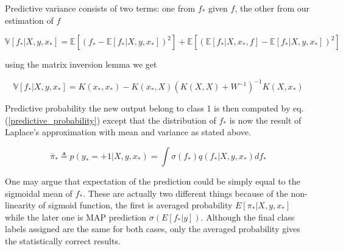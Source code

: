 \documentclass[11pt]{report}
\numberwithin{equation}{chapter}
\begin{document}
\begin{spacing}{2}
Predictive variance consists of two terms: one from $f_\ast$ given $f$, the other from our estimation of $f$

\begin{equation}
\label{predictive_var_classification}
\mathbb{V}[f_\ast|X,y,x_\ast] = \mathbb{E}[(f_\ast - \mathbb{E}[f_\ast|X,y,x_\ast])^2] + \mathbb{E}[(\mathbb{E}[f_\ast|X,x_\ast,f] - \mathbb{E}[f_\ast|X,y,x_\ast])^2]
\end{equation}

using the matrix inversion lemma\cite{woodbury1950inverting} we get

\begin{equation}
\mathbb{V}[f_\ast|X,y,x_\ast] = K(x_\ast,x_\ast) - K(x_\ast,X)(K(X,X) + W^{-1})^{-1}K(X,x_\ast)
\end{equation}

Predictive probability the new output belong to class 1 is then computed by eq. (\ref{predictive_probability}) except that the distribution of $f_\ast$ is now the result of Laplace's approximation with mean and variance as stated above. 

\begin{equation}
\bar{\pi}_* \triangleq p(y_* = +1|X,y,x_*) = \int \sigma (f_*)q(f_*|X,y,x_*) df_*
\end{equation}

One may argue that expectation of the prediction could be simply equal to the sigmoidal mean of $f_*$. These are actually two different things because of the non-linearity of sigmoid function, the first is averaged probability $E[\pi_*|X,y,x_*]$ while the later one is MAP prediction $\sigma (E[f_*|y])$. Although the final class labels assigned are the same for both cases, only the averaged probability gives the statistically correct results. 

\begin{figure}[!htb]


\end{figure}
\end{spacing}
\end{document}
